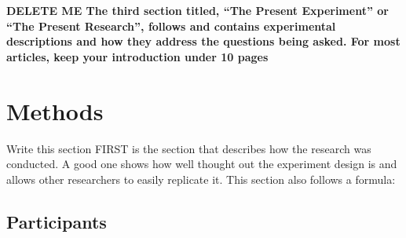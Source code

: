 \textbf{DELETE ME The third section titled, “The Present Experiment” or “The Present Research”, follows and contains experimental descriptions and how they address the questions being asked.
For most articles, keep your introduction under 10 pages}


\section{Methods}

Write this section FIRST
is the section that describes how the research was conducted. A good one shows how well thought out the experiment design is and allows other researchers to easily replicate it. This section also follows a formula:

\subsection{Participants}

